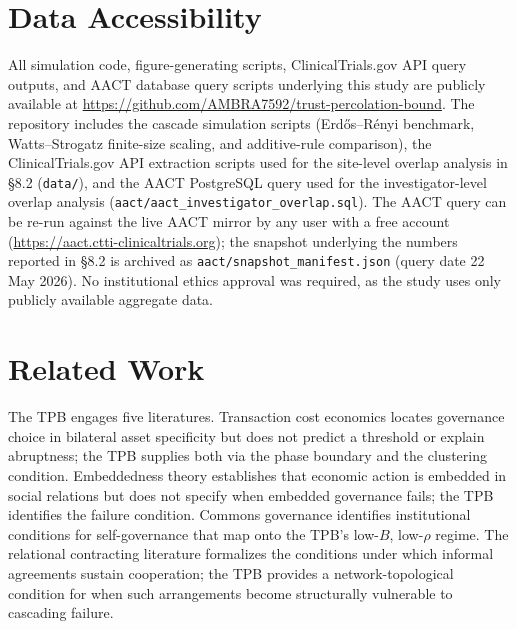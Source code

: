 \documentclass[11pt,a4paper]{article}
\begin{document}

\section*{Data Accessibility}

All simulation code, figure-generating scripts, ClinicalTrials.gov API query outputs, and AACT database query scripts underlying this study are publicly available at \url{https://github.com/AMBRA7592/trust-percolation-bound}. The repository includes the cascade simulation scripts (Erd\H{o}s--R\'enyi benchmark, Watts--Strogatz finite-size scaling, and additive-rule comparison), the ClinicalTrials.gov API extraction scripts used for the site-level overlap analysis in \S8.2 (\texttt{data/}), and the AACT PostgreSQL query used for the investigator-level overlap analysis (\texttt{aact/aact\_investigator\_overlap.sql}). The AACT query can be re-run against the live AACT mirror by any user with a free account (\url{https://aact.ctti-clinicaltrials.org}); the snapshot underlying the numbers reported in \S8.2 is archived as \texttt{aact/snapshot\_manifest.json} (query date 22 May 2026). No institutional ethics approval was required, as the study uses only publicly available aggregate data.



\section{Related Work}

The TPB engages five literatures. Transaction cost economics \cite{williamson1975,williamson1985} locates governance choice in bilateral asset specificity but does not predict a threshold or explain abruptness; the TPB supplies both via the phase boundary and the clustering condition. Embeddedness theory \cite{granovetter1985} establishes that economic action is embedded in social relations but does not specify when embedded governance fails; the TPB identifies the failure condition. Commons governance \cite{ostrom1990} identifies institutional conditions for self-governance that map onto the TPB's low-$B$, low-$\rho$ regime. The relational contracting literature \cite{baker2002} formalizes the conditions under which informal agreements sustain cooperation; the TPB provides a network-topological condition for when such arrangements become structurally vulnerable to cascading failure.
\end{document}
